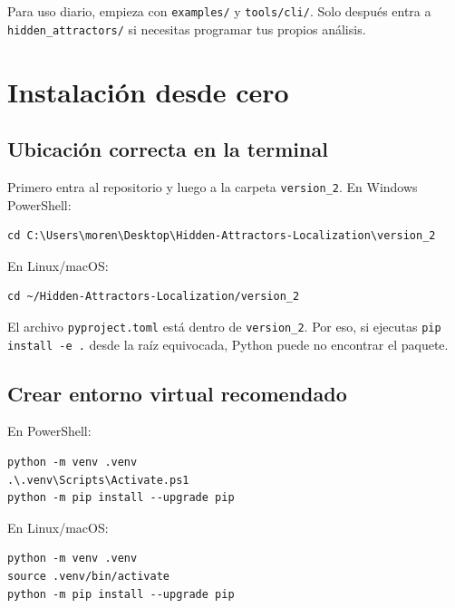 \documentclass[11pt,letterpaper]{article}
\begin{document}
\begin{idea}
Para uso diario, empieza con \texttt{examples/} y \texttt{tools/cli/}. Solo después entra a \texttt{hidden\_attractors/} si necesitas programar tus propios análisis.
\end{idea}

\section{Instalación desde cero}

\subsection{Ubicación correcta en la terminal}

Primero entra al repositorio y luego a la carpeta \texttt{version\_2}. En Windows PowerShell:

\begin{lstlisting}[style=terminal]
cd C:\Users\moren\Desktop\Hidden-Attractors-Localization\version_2
\end{lstlisting}

En Linux/macOS:

\begin{lstlisting}[style=terminal]
cd ~/Hidden-Attractors-Localization/version_2
\end{lstlisting}

El archivo \texttt{pyproject.toml} está dentro de \texttt{version\_2}. Por eso, si ejecutas \texttt{pip install -e .} desde la raíz equivocada, Python puede no encontrar el paquete.

\subsection{Crear entorno virtual recomendado}

En PowerShell:

\begin{lstlisting}[style=terminal]
python -m venv .venv
.\.venv\Scripts\Activate.ps1
python -m pip install --upgrade pip
\end{lstlisting}

En Linux/macOS:

\begin{lstlisting}[style=terminal]
python -m venv .venv
source .venv/bin/activate
python -m pip install --upgrade pip
\end{lstlisting}
\end{document}
